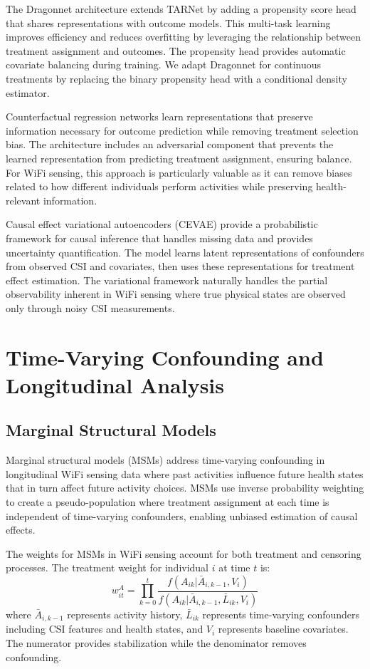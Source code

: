 \documentclass[journal]{IEEEtran}
\begin{document}
The Dragonnet architecture extends TARNet by adding a propensity score head that shares representations with outcome models. This multi-task learning improves efficiency and reduces overfitting by leveraging the relationship between treatment assignment and outcomes. The propensity head provides automatic covariate balancing during training. We adapt Dragonnet for continuous treatments by replacing the binary propensity head with a conditional density estimator.

Counterfactual regression networks learn representations that preserve information necessary for outcome prediction while removing treatment selection bias. The architecture includes an adversarial component that prevents the learned representation from predicting treatment assignment, ensuring balance. For WiFi sensing, this approach is particularly valuable as it can remove biases related to how different individuals perform activities while preserving health-relevant information.

Causal effect variational autoencoders (CEVAE) provide a probabilistic framework for causal inference that handles missing data and provides uncertainty quantification. The model learns latent representations of confounders from observed CSI and covariates, then uses these representations for treatment effect estimation. The variational framework naturally handles the partial observability inherent in WiFi sensing where true physical states are observed only through noisy CSI measurements.

\section{Time-Varying Confounding and Longitudinal Analysis}

\subsection{Marginal Structural Models}

Marginal structural models (MSMs) address time-varying confounding in longitudinal WiFi sensing data where past activities influence future health states that in turn affect future activity choices. MSMs use inverse probability weighting to create a pseudo-population where treatment assignment at each time is independent of time-varying confounders, enabling unbiased estimation of causal effects.

The weights for MSMs in WiFi sensing account for both treatment and censoring processes. The treatment weight for individual $i$ at time $t$ is:
$$w_{it}^A = \prod_{k=0}^t \frac{f(A_{ik} | \bar{A}_{i,k-1}, V_i)}{f(A_{ik} | \bar{A}_{i,k-1}, \bar{L}_{ik}, V_i)}$$
where $\bar{A}_{i,k-1}$ represents activity history, $\bar{L}_{ik}$ represents time-varying confounders including CSI features and health states, and $V_i$ represents baseline covariates. The numerator provides stabilization while the denominator removes confounding.
\end{document}
